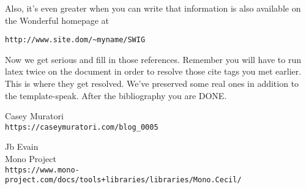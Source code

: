 \documentclass[letterpaper,twocolumn,10pt]{article}
\begin{document}
Also, it's even greater when you can write that information is also 
available on the Wonderful homepage at 

\begin{center}
{\tt http://www.site.dom/\~{}myname/SWIG}
\end{center}

Now we get serious and fill in those references.  Remember you will
have to run latex twice on the document in order to resolve those
cite tags you met earlier.  This is where they get resolved.
We've preserved some real ones in addition to the template-speak.
After the bibliography you are DONE.

\begin{thebibliography}{9}
    Casey Muratori\\
    \texttt{https://caseymuratori.com/blog\_0005}

    Jb Evain\\
    Mono Project\\
    \texttt{https://www.mono-project.com/docs/tools+libraries/libraries/Mono.Cecil/}
\end{thebibliography}






\theendnotes
\end{document}
